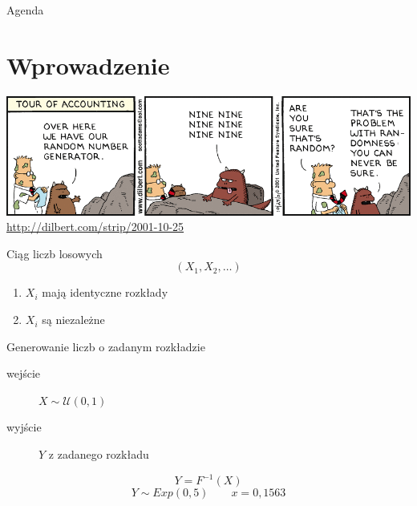 \documentclass{mp}
\subtitle{Generatory liczb pseudolosowych}
\begin{document}
\frame{\titlepage}
\begin{frame}{Agenda}
\tableofcontents
\end{frame}

\section{Wprowadzenie}

\begin{frame}{9}
\includegraphics[width=\textwidth]{15_prng/dilbert.png}
\vfill
{\small \url{http://dilbert.com/strip/2001-10-25}}
\end{frame}
\begin{frame}{Ciąg liczb losowych}
\[ (X_1, X_2, \ldots) \]
\pause
\begin{enumerate}
\item $X_i$ mają identyczne rozkłady
\item $X_i$ są niezależne
\end{enumerate}
\end{frame}
\begin{frame}{Generowanie liczb o zadanym rozkładzie}
\begin{description}
\item[wejście] $X\sim\mathcal{U}(0,1)$
\item[wyjście] $Y$ z zadanego rozkładu
\end{description}
\pause
\[ Y=F^{-1}(X) \]
\pause
\[Y\sim Exp(0{,}5) \qquad x=0{,}1563 \]
\end{frame}
\end{document}
